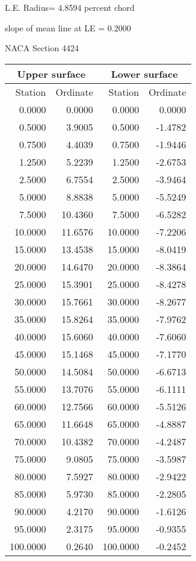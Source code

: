 \documentclass[11pt]{book}
\begin{document}
L.E. Radius=  4.8594 percent chord


 slope of mean line at LE =  0.2000
 \newpage
  \label{s4424}
 \begin{Large}
 NACA Section 4424
 \end{Large}
  
 \vspace{8mm}
 \begin{tabular}{|r|r|r|r|} \hline 
 \multicolumn{2}{|c|}{Upper surface} & \multicolumn{2}{|c|}{Lower surface} \\
 \hline
 Station & Ordinate & Station & Ordinate \\
 \hline
0.0000 & 0.0000 & 0.0000 & 0.0000 \\
0.5000 & 3.9005 & 0.5000 & -1.4782 \\
0.7500 & 4.4039 & 0.7500 & -1.9446 \\
1.2500 & 5.2239 & 1.2500 & -2.6753 \\
2.5000 & 6.7554 & 2.5000 & -3.9464 \\
5.0000 & 8.8838 & 5.0000 & -5.5249 \\
7.5000 & 10.4360 & 7.5000 & -6.5282 \\
10.0000 & 11.6576 & 10.0000 & -7.2206 \\
15.0000 & 13.4538 & 15.0000 & -8.0419 \\
20.0000 & 14.6470 & 20.0000 & -8.3864 \\
25.0000 & 15.3901 & 25.0000 & -8.4278 \\
30.0000 & 15.7661 & 30.0000 & -8.2677 \\
35.0000 & 15.8264 & 35.0000 & -7.9762 \\
40.0000 & 15.6060 & 40.0000 & -7.6060 \\
45.0000 & 15.1468 & 45.0000 & -7.1770 \\
50.0000 & 14.5084 & 50.0000 & -6.6713 \\
55.0000 & 13.7076 & 55.0000 & -6.1111 \\
60.0000 & 12.7566 & 60.0000 & -5.5126 \\
65.0000 & 11.6648 & 65.0000 & -4.8887 \\
70.0000 & 10.4382 & 70.0000 & -4.2487 \\
75.0000 & 9.0805 & 75.0000 & -3.5987 \\
80.0000 & 7.5927 & 80.0000 & -2.9422 \\
85.0000 & 5.9730 & 85.0000 & -2.2805 \\
90.0000 & 4.2170 & 90.0000 & -1.6126 \\
95.0000 & 2.3175 & 95.0000 & -0.9355 \\
100.0000 & 0.2640 & 100.0000 & -0.2452 \\
 \hline 
 \end{tabular}
\end{document}
